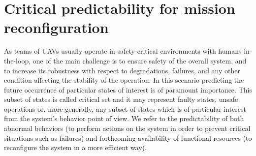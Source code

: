\documentclass[letterpaper, 10 pt, conference]{ieeeconf}
\begin{document}
\section{Critical predictability for mission reconfiguration}\label{sec:Predictability}
As teams of UAVs usually operate in safety-critical environments with humans in-the-loop, one of the main challenge is to ensure safety of the overall system, and to increase its robustness with respect to degradations, failures, and any other condition affecting the stability of the operation. 
%
In this scenario predicting the future occurrence of particular states of interest is of paramount importance. 
This subset of states is called critical set and it may represent faulty states, unsafe operations or, more generally, any subset of states which is of particular interest from the system's behavior point of view. We refer to the predictability of both abnormal behaviors (to perform actions on the system in order to prevent critical situations such as failures) and forthcoming availability of functional resources (to reconfigure the system in a more efficient way).
\end{document}
